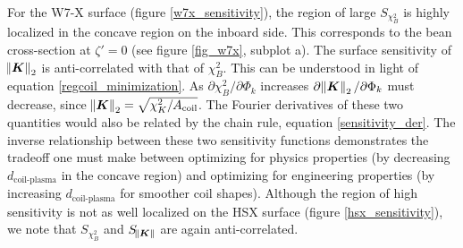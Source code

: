 \documentclass[aps,unsortedaddress]{revtex4-1}
\begin{document}
For the W7-X surface (figure \ref{w7x_sensitivity}), the region of large $S_{\chi^2_B}$ is highly localized in the concave region on the inboard side. This corresponds to the bean cross-section at $\zeta' = 0$ (see figure \ref{fig_w7x}, subplot a). The surface sensitivity of $\norm{\bm{K}}_2$ is anti-correlated with that of $\chi^2_B$. This can be understood in light of equation \ref{regcoil_minimization}. As $\partial \chi^2_B/\partial \Phi_k$ increases $\partial \norm{\bm{K}}_2/\partial \Phi_k$ must decrease, since $\norm{\bm{K}}_2 = \sqrt{ \chi^2_K/A_{\text{coil}}}$. The Fourier  derivatives of these two quantities would also be related by the chain rule, equation \ref{sensitivity_der}. The inverse relationship between these two sensitivity functions demonstrates the tradeoff one must make between optimizing for physics properties (by decreasing $d_{\text{coil-plasma}}$ in the concave region) and optimizing for engineering properties (by increasing $d_{\text{coil-plasma}}$ for smoother coil shapes). Although the region of high sensitivity is not as well localized on the HSX surface (figure \ref{hsx_sensitivity}), we note that $S_{\chi^2_B}$ and $S_{\norm{\bm{K}}}$ are again anti-correlated. 
\end{document}
